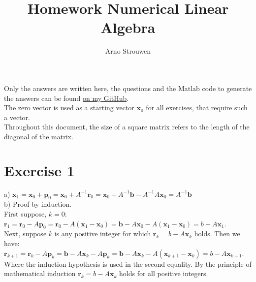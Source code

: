 \documentclass{article}
\begin{document}
	\title{Homework Numerical Linear Algebra}
	\author{Arno Strouwen}
	\maketitle
\noindent Only the answers are written here, the questions and the Matlab code to generate the answers can be found \href{https://github.com/arno-training-material/Master-of-Statistics-and-Data-Science/tree/main/Advanced\%20Topics\%20in\%20Data\%20Science}{on my GitHub}.
\\
The zero vector is used as a starting vector $\bm x_0$ for all exercises, that require such a vector.\\
Throughout this document, the size of a square matrix refers to the length of the diagonal of the matrix.
\section*{Exercise 1}
a) $\bm x_1 = \bm x_0 + \bm p_0 = \bm x_0 + A^{-1}\bm r_0 = \bm x_0 + A^{-1}\bm b -A^{-1}A\bm x_0 = A^{-1}\bm b$
\\
b) Proof by induction.
\\
First suppose, $k=0$:
\\
$\bm r_1 = \bm r_0 - A\bm p_0 = \bm r_0 - A(\bm x_1 - \bm x_0) = \bm b - A\bm x_0  -A(\bm x_1 - \bm x_0) = b - A\bm x_1$.
\\
Next, suppose $k$ is any positive integer for which $\bm r_k = b - A\bm x_k$ holds.
Then we have:
\\
$\bm r_{k+1} = \bm r_k - A\bm p_k = \bm b - A\bm x_k- A\bm p_k = \bm b - A\bm x_k - A( \bm x_{k+1} - \bm x_k) = b - A\bm x_{k+1}.$
\\
Where the induction hypothesis is used in the second equality. By the principle of mathematical induction $\bm r_k = b - A\bm x_k$ holds for all positive integers. 
\end{document}
